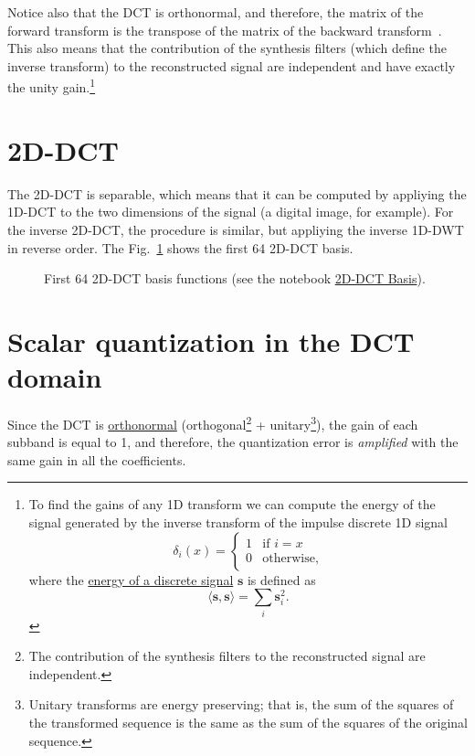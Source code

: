 Notice also that the DCT is orthonormal, and therefore, the matrix of
the forward transform is the transpose of the matrix of the backward
transform~\cite{sayood2017introduction}. This also means that the
contribution of the synthesis filters (which define the inverse
transform) to the reconstructed signal are independent and have
exactly the unity gain.\footnote{To find the gains of any 1D transform
we can compute the energy of the signal generated by the inverse
transform of the impulse discrete 1D signal
\begin{equation}
  \delta_{i}(x) = 
  \left\{
  \begin{array}{ll}
    1 & \text{if $i=x$}\\
    0 & \text{otherwise},
  \end{array}
  \right.
\end{equation}
where the
\href{https://en.wikipedia.org/wiki/Energy_(signal_processing)}{energy
  of a discrete signal} ${\mathbf s}$ is defined as
\begin{equation}
  \langle {\mathbf s}, {\mathbf s} \rangle =  \sum_{i}{{\mathbf s}_i^2}.
\end{equation}
}

\section{2D-DCT}

The 2D-DCT is separable, which means that it can be computed by
appliying the 1D-DCT to the two dimensions of the signal (a digital
image, for example). For the inverse 2D-DCT, the procedure is similar,
but appliying the inverse 1D-DWT in reverse order. The
Fig.~\ref{fig:2D-DCT_basis} shows the first 64 2D-DCT basis.

\begin{figure}
  \centering {}
  \caption{First 64 2D-DCT basis functions (see the notebook
    \href{https://github.com/vicente-gonzalez-ruiz/DCT/blob/master/docs/HTML/graphics/2D-DCT_basis.ipynb}{2D-DCT
      Basis}).}
  \label{fig:2D-DCT_basis}
\end{figure}

\section{Scalar quantization in the DCT domain}

Since the DCT is
\href{https://en.wikipedia.org/wiki/Orthonormality}{orthonormal}
(orthogonal\footnote{The contribution of the synthesis filters to the
reconstructed signal are independent.} + unitary\footnote{Unitary
transforms are energy preserving; that is, the sum of the squares of
the transformed sequence is the same as the sum of the squares of the
original sequence.}), the gain of each subband is equal to 1, and
therefore, the quantization error is \emph{amplified} with the same
gain in all the coefficients.

